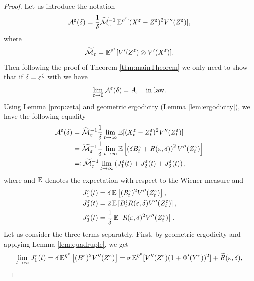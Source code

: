 \documentclass[10pt]{article}
\begin{document}
\begin{proof}
	Let us introduce the notation
	\begin{equation}
	\mathcal A^\varepsilon(\delta) = \frac1\delta \widetilde{\mathcal M}_\varepsilon^{-1} \operatorname{\mathbb{E}}^{\rho^\varepsilon}[(X^\varepsilon - Z^\varepsilon)^2 V''(Z^\varepsilon)],
	\end{equation}
	where
	\begin{equation}
	\widetilde{\mathcal M}_\varepsilon = \operatorname{\mathbb{E}}^{\rho^\varepsilon} [ V'(Z^\varepsilon) \otimes V'(X^\varepsilon) ].
	\end{equation}
	Then following the proof of Theorem \ref{thm:mainTheorem} we only need to show that if $\delta = \varepsilon^\zeta$ with  we have
	\begin{equation}
	\lim_{\varepsilon \to 0} \mathcal A^\varepsilon(\delta) = A, \quad \text{in law}.
	\end{equation}
	Using Lemma \ref{prop:zeta} and geometric ergodicity (Lemma \ref{lem:ergodicity}), we have the following equality
	\begin{equation}
	\begin{aligned}
	\mathcal A^\varepsilon(\delta) &= \widetilde{\mathcal M}_\varepsilon^{-1} \frac1\delta \lim_{t \to \infty} \operatorname{\mathbb{E}} [(X_t^\varepsilon - Z_t^\varepsilon)^2 V''(Z_t^\varepsilon)] \\
	&= \widetilde{\mathcal M}_\varepsilon^{-1} \frac1\delta \lim_{t \to \infty} \operatorname{\mathbb{E}} \left[ \left( \delta B_t^\varepsilon + R(\varepsilon,\delta) \right)^2 V''(Z_t^\varepsilon) \right] \\
	&\eqqcolon \widetilde{\mathcal M}_\varepsilon^{-1} \lim_{t \to \infty} \left( J_1^\varepsilon(t) + J_2^\varepsilon(t) + J_3^\varepsilon(t) \right),
	\end{aligned}
	\end{equation}
	where and $\operatorname{\mathbb{E}}$ denotes the expectation with respect to the Wiener measure and
	\begin{equation}
	\begin{aligned}
	J_1^\varepsilon(t) &= \delta \operatorname{\mathbb{E}} \left[ (B_t^\varepsilon)^2 V''(Z_t^\varepsilon) \right], \\
	J_2^\varepsilon(t) &= 2 \operatorname{\mathbb{E}} \left[ B_t^\varepsilon R(\varepsilon,\delta) V''(Z_t^\varepsilon) \right], \\
	J_3^\varepsilon(t) &= \frac1\delta \operatorname{\mathbb{E}}\left[ R(\varepsilon,\delta)^2 V''(Z_t^\varepsilon) \right].
	\end{aligned}
	\end{equation}
	Let us consider the three terms separately. First, by geometric ergodicity and applying Lemma \ref{lem:quadruple}, we get
	\begin{equation}
	\lim_{t \to \infty} J_1^\epl(t) = \delta \E^{\eta^\epl} \left[ (B^\epl)^2 V''(Z^\epl) \right] = \sigma \E^{\eta^\epl} [V''(Z^\epl) (1 + \Phi'(Y^\epl))^2] + \widetilde R(\epl,\delta),

\end{equation}
\end{proof}
\end{document}
